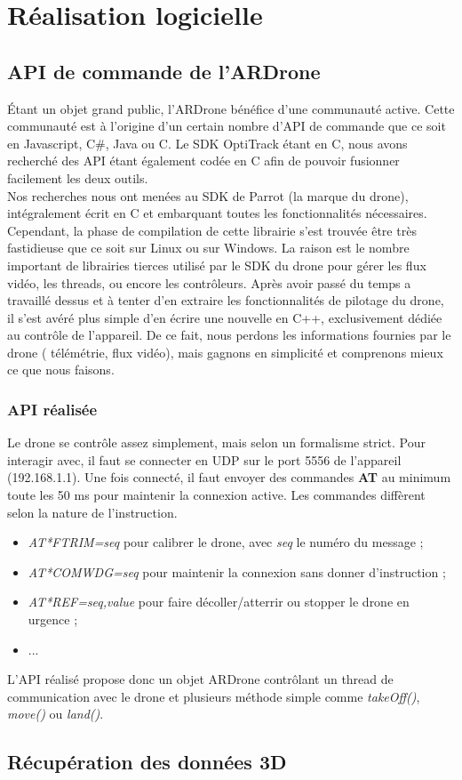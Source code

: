 \chapter{Réalisation logicielle}
\section{API de commande de l'ARDrone}
Étant un objet grand public, l'ARDrone bénéfice d'une communauté active. Cette communauté est à l'origine d'un certain nombre d'API de commande que ce soit en Javascript, C\#, Java ou C. Le SDK OptiTrack étant en C, nous avons recherché des API étant également codée en C afin de pouvoir fusionner facilement les deux outils.\\
Nos recherches nous ont menées au SDK de Parrot (la marque du drone), intégralement écrit en C et embarquant toutes les fonctionnalités nécessaires. Cependant, la phase de compilation de cette librairie s'est trouvée être très fastidieuse que ce soit sur Linux ou sur Windows. La raison est le nombre important de librairies tierces utilisé par le SDK du drone pour gérer les flux vidéo, les threads, ou encore les contrôleurs. Après avoir passé du temps a travaillé dessus et à tenter d'en extraire les fonctionnalités de pilotage du drone, il s'est avéré plus simple d'en écrire une nouvelle en C++, exclusivement dédiée au contrôle de l'appareil. De ce fait, nous perdons les informations fournies par le drone ( télémétrie, flux vidéo), mais gagnons en simplicité et comprenons mieux ce que nous faisons.
\subsection{API réalisée}
Le drone se contrôle assez simplement, mais selon un formalisme strict. Pour interagir avec, il faut se connecter en UDP sur le port 5556 de l'appareil (192.168.1.1). Une fois connecté, il faut envoyer des commandes \textbf{AT} au minimum toute les 50 ms pour maintenir la connexion active. Les commandes diffèrent selon la nature de l'instruction.
\begin{itemize}
\item \textit{AT*FTRIM=seq} pour calibrer le drone, avec \textit{seq} le numéro du message ;
\item \textit{AT*COMWDG=seq} pour maintenir la connexion sans donner d'instruction ;
\item \textit{AT*REF=seq,value} pour faire décoller/atterrir ou stopper le drone en urgence ;
\item ...
\end{itemize}
L'API réalisé propose donc un objet ARDrone contrôlant un thread de communication avec le drone et plusieurs méthode simple comme \textit{takeOff()}, \textit{move()} ou \textit{land()}.
\section{Récupération des données 3D}